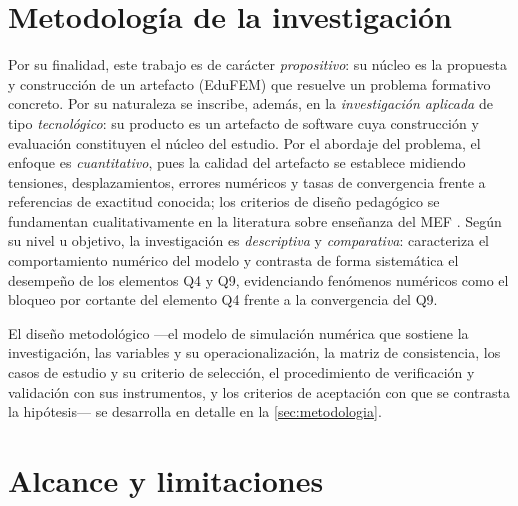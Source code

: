 \section*{Metodología de la investigación}

Por su finalidad, este trabajo es de carácter \emph{propositivo}: su núcleo es la propuesta y construcción de un artefacto (EduFEM) que resuelve un problema formativo concreto. Por su naturaleza se inscribe, además, en la \emph{investigación aplicada} de tipo \emph{tecnológico}: su producto es un artefacto de software cuya construcción y evaluación constituyen el núcleo del estudio. Por el abordaje del problema, el enfoque es \emph{cuantitativo}, pues la calidad del artefacto se establece midiendo tensiones, desplazamientos, errores numéricos y tasas de convergencia frente a referencias de exactitud conocida; los criterios de diseño pedagógico se fundamentan cualitativamente en la literatura sobre enseñanza del MEF \autocite{lee2015interactive,bishay2020teaching}. Según su nivel u objetivo, la investigación es \emph{descriptiva} y \emph{comparativa}: caracteriza el comportamiento numérico del modelo y contrasta de forma sistemática el desempeño de los elementos Q4 y Q9, evidenciando fenómenos numéricos como el bloqueo por cortante del elemento Q4 frente a la convergencia del Q9.

El diseño metodológico —el modelo de simulación numérica que sostiene la investigación, las variables y su operacionalización, la matriz de consistencia, los casos de estudio y su criterio de selección, el procedimiento de verificación y validación con sus instrumentos, y los criterios de aceptación con que se contrasta la hipótesis— se desarrolla en detalle en la \autoref{sec:metodologia}.

\section*{Alcance y limitaciones}

